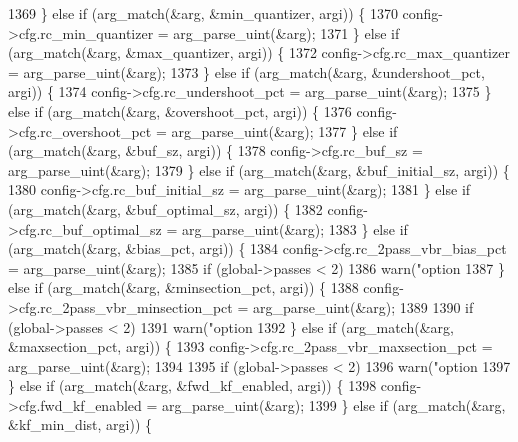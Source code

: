 \begin{DoxyCodeInclude}
{{{{{{{{{{{{{{{{1369     \} \textcolor{keywordflow}{else} \textcolor{keywordflow}{if} (arg\_match(&arg, &min\_quantizer, argi)) \{
1370       config->cfg.rc\_min\_quantizer = arg\_parse\_uint(&arg);
1371     \} \textcolor{keywordflow}{else} \textcolor{keywordflow}{if} (arg\_match(&arg, &max\_quantizer, argi)) \{
1372       config->cfg.rc\_max\_quantizer = arg\_parse\_uint(&arg);
1373     \} \textcolor{keywordflow}{else} \textcolor{keywordflow}{if} (arg\_match(&arg, &undershoot\_pct, argi)) \{
1374       config->cfg.rc\_undershoot\_pct = arg\_parse\_uint(&arg);
1375     \} \textcolor{keywordflow}{else} \textcolor{keywordflow}{if} (arg\_match(&arg, &overshoot\_pct, argi)) \{
1376       config->cfg.rc\_overshoot\_pct = arg\_parse\_uint(&arg);
1377     \} \textcolor{keywordflow}{else} \textcolor{keywordflow}{if} (arg\_match(&arg, &buf\_sz, argi)) \{
1378       config->cfg.rc\_buf\_sz = arg\_parse\_uint(&arg);
1379     \} \textcolor{keywordflow}{else} \textcolor{keywordflow}{if} (arg\_match(&arg, &buf\_initial\_sz, argi)) \{
1380       config->cfg.rc\_buf\_initial\_sz = arg\_parse\_uint(&arg);
1381     \} \textcolor{keywordflow}{else} \textcolor{keywordflow}{if} (arg\_match(&arg, &buf\_optimal\_sz, argi)) \{
1382       config->cfg.rc\_buf\_optimal\_sz = arg\_parse\_uint(&arg);
1383     \} \textcolor{keywordflow}{else} \textcolor{keywordflow}{if} (arg\_match(&arg, &bias\_pct, argi)) \{
1384       config->cfg.rc\_2pass\_vbr\_bias\_pct = arg\_parse\_uint(&arg);
1385       \textcolor{keywordflow}{if} (global->passes < 2)
1386         warn(\textcolor{stringliteral}{"option %
1387     \} \textcolor{keywordflow}{else} \textcolor{keywordflow}{if} (arg\_match(&arg, &minsection\_pct, argi)) \{
1388       config->cfg.rc\_2pass\_vbr\_minsection\_pct = arg\_parse\_uint(&arg);
1389 
1390       \textcolor{keywordflow}{if} (global->passes < 2)
1391         warn(\textcolor{stringliteral}{"option %
1392     \} \textcolor{keywordflow}{else} \textcolor{keywordflow}{if} (arg\_match(&arg, &maxsection\_pct, argi)) \{
1393       config->cfg.rc\_2pass\_vbr\_maxsection\_pct = arg\_parse\_uint(&arg);
1394 
1395       \textcolor{keywordflow}{if} (global->passes < 2)
1396         warn(\textcolor{stringliteral}{"option %
1397     \} \textcolor{keywordflow}{else} \textcolor{keywordflow}{if} (arg\_match(&arg, &fwd\_kf\_enabled, argi)) \{
1398       config->cfg.fwd\_kf\_enabled = arg\_parse\_uint(&arg);
1399     \} \textcolor{keywordflow}{else} \textcolor{keywordflow}{if} (arg\_match(&arg, &kf\_min\_dist, argi)) \{
}}}}}}}}}}}}}}}}}}}
\end{DoxyCodeInclude}

